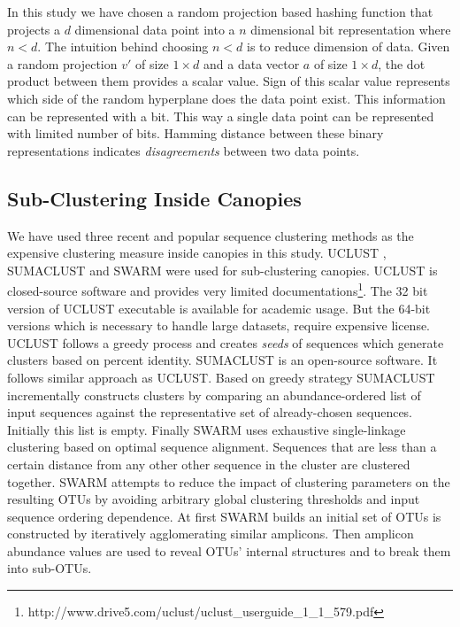 \documentclass[10pt, conference, compsocconf]{IEEEtran}
\begin{document}
In this study we have chosen a random projection based hashing function that projects a $d$ dimensional data point into a $n$ dimensional bit representation where $n<d$. The intuition behind choosing $n<d$ is to reduce dimension of data. Given a random projection $v'$ of size $1 \times d$ and a data vector $a$ of size $1 \times d$, the dot product between them provides a scalar value. Sign of this scalar value represents which side of the random hyperplane does the data point exist. This information can be represented with a bit. This way a single data point can be represented with limited number of bits. Hamming distance between these binary representations indicates \textit{disagreements} between two data points.

\subsection{Sub-Clustering Inside Canopies}
\label{sub-cluster}
We have used three recent and popular sequence clustering methods as the expensive clustering measure inside canopies in this study. UCLUST \cite{MARuclust}, SUMACLUST \cite{MARSumaclust} and SWARM \cite{MARSwarm} were used for sub-clustering canopies. UCLUST is closed-source software and provides very limited documentations\footnote{http://www.drive5.com/uclust/uclust\_userguide\_1\_1\_579.pdf}. The 32 bit version of UCLUST executable is available for academic usage. But the 64-bit versions which is necessary to handle large datasets, require expensive license. UCLUST follows a greedy process and creates \textit{seeds} of sequences which generate clusters based on percent identity.
SUMACLUST is an open-source software. It follows similar approach as UCLUST. Based on greedy strategy SUMACLUST incrementally constructs clusters by comparing an abundance-ordered list of input sequences against the representative set of already-chosen sequences. Initially this list is empty. Finally SWARM uses exhaustive single-linkage clustering based on optimal sequence alignment. Sequences that are less than a certain distance from any other other sequence in the cluster are clustered together. SWARM attempts to reduce the impact of clustering parameters on the resulting OTUs by avoiding arbitrary global clustering thresholds and input sequence ordering dependence. At first SWARM builds an initial set of OTUs is constructed by iteratively agglomerating similar amplicons. Then amplicon abundance values are used to reveal OTUs’ internal structures and to break them into sub-OTUs.
\end{document}
